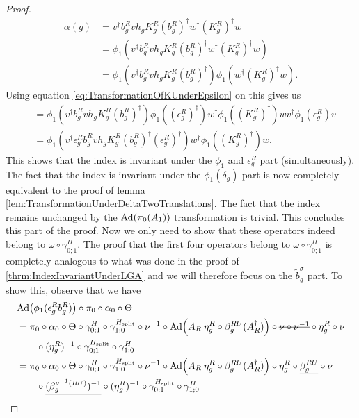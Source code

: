 \documentclass[12pt,a4paper,twoside]{article}
\numberwithin{equation}{section}
\begin{document}
\begin{proof}
\begin{align}
\alpha(g)&=v^\dagger b_g^R v h_g K_g^R (b_g^R)^\dagger w^\dagger (K_g^R)^\dagger w\\
&=\phi_1(v^\dagger b_g^R v h_g K_g^R (b_g^R)^\dagger w^\dagger (K_g^R)^\dagger w)\\
&=\phi_1(v^\dagger b_g^R v h_g K_g^R (b_g^R)^\dagger)\phi_1( w^\dagger (K_g^R)^\dagger w).
\end{align}
Using equation \eqref{eq:TransformationOfKUnderEpsilon} on this gives us
\begin{align}
&=\phi_1(v^\dagger b_g^R v h_g K_g^R (b_g^R)^\dagger)\phi_1((\epsilon_g^R)^\dagger)w^\dagger\phi_1(  (K_g^R)^\dagger )wv^\dagger \phi_1(\epsilon_g^R)v\\
&=\phi_1(v^\dagger \epsilon_g^R b_g^R v h_g K_g^R (b_g^R)^\dagger (\epsilon_g^R)^\dagger)w^\dagger\phi_1(  (K_g^R)^\dagger )w.
\end{align}
This shows that the index is invariant under the $\phi_1$ and $\epsilon^R_g$ part (simultaneously). The fact that the index is invariant under the $\phi_1(\delta_g)$ part is now completely equivalent to the proof of lemma \ref{lem:TransformationUnderDeltaTwoTranslations}. The fact that the index remains unchanged by the $\Ad{\pi_0(A_1)}$ transformation is trivial. This concludes this part of the proof. Now we only need to show that these operators indeed belong to $\omega\circ\gamma^H_{0;1}$. The proof that the first four operators belong to $\omega\circ\gamma^H_{0;1}$ is completely analogous to what was done in the proof of \ref{thrm:IndexInvariantUnderLGA} and we will therefore focus on the $\tilde{b}_g^\sigma$ part. To show this, observe that we have
	\begin{align}
		&\Ad{\phi_1(\epsilon_g^R b_g^R)}\circ\pi_0\circ\alpha_0\circ\Theta\\
		&=\pi_0\circ\alpha_0\circ\Theta\circ\gamma^H_{0;1}\circ\gamma^{H_{\text{split}}}_{1;0}\circ\nu^{-1}\circ\Ad{A_R\: \eta_g^R\circ\beta_g^{RU}(A_R^\dagger)}\circ\stkout{\nu\circ\nu^{-1}}\circ\eta_g^R\circ\nu\\
		\nonumber
		&\qquad\circ(\eta_g^R)^{-1}\circ\gamma^{H_{\text{split}}}_{0;1}\circ\gamma^{H}_{1;0}\\
		&=\pi_0\circ\alpha_0\circ\Theta\circ\gamma^H_{0;1}\circ\gamma^{H_{\text{split}}}_{1;0}\circ\nu^{-1}\circ\Ad{A_R\: \eta_g^R\circ\beta_g^{RU}(A_R^\dagger)}\circ\eta_g^R\circ\underline{\beta_g^{RU}}\circ\nu\\
		\nonumber
		&\qquad\circ\underline{(\beta_g^{\nu^{-1}(RU)})^{-1}}\circ(\eta_g^R)^{-1}\circ\gamma^{H_{\text{split}}}_{0;1}\circ\gamma^{H}_{1;0}\\

\end{align}
\end{proof}
\end{document}
